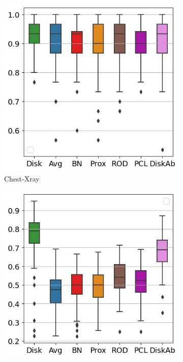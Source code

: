 \documentclass[journal]{IEEEtai}
\begin{document}
\begin{figure}[ht!]
	\centering
	\begin{subfigure}[t]{0.3\linewidth}	
		\includegraphics[width=\linewidth]{Figures/xray/ClientAcc}
		\caption{Chest-Xray }
		\label{fig:cl_acc_xray}
	\end{subfigure}
	\hspace{0.01em}%
	\begin{subfigure}[t]{0.3\linewidth}
		\includegraphics[width=\linewidth]{Figures/femnist/ClientAcc}

\end{subfigure}
\end{figure}
\end{document}
